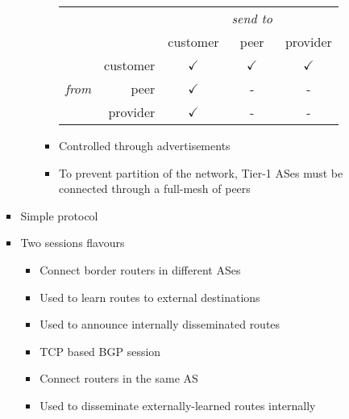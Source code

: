 \begin{itemize}
\begin{itemize}
\begin{itemize}
\begin{itemize}
\begin{itemize}
\begin{tabular}{| c r | c c c |}
    &&& \textit{send to} &\\
    &&customer & peer & provider\\\hline
    & customer & $\checkmark$ & $\checkmark$ & $\checkmark$\\
    \textit{from} & peer & $\checkmark$ & - & -\\
         &provider & $\checkmark$ & - & -\\
\end{tabular}
                                    \item Controlled through advertisements
                                    \item To prevent partition of the network, Tier-1 ASes must be connected through a full-mesh of peers
                                \end{itemize}
                        \end{itemize}
                \end{itemize}
                \begin{itemize}
                    \item Simple protocol
                    \item Two sessions flavours
                        \begin{itemize}
                                \begin{itemize}
                                    \item Connect border routers in different ASes
                                    \item Used to learn routes to external destinations
                                    \item Used to announce internally disseminated routes
                                    \item TCP based BGP session
                                \end{itemize}
                                \begin{itemize}
                                    \item Connect routers in the same AS
                                    \item Used to disseminate externally-learned routes internally
                                \end{itemize}
                        \end{itemize}

\end{itemize}
\end{itemize}
\end{itemize}
